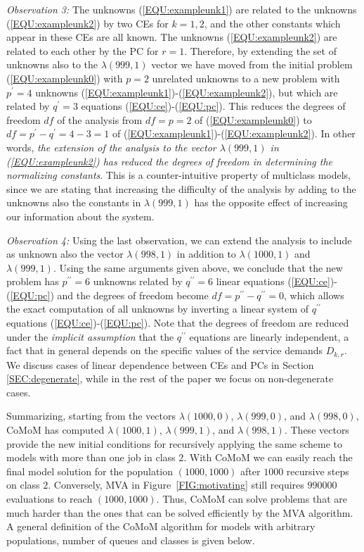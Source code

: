 \documentclass[journal,twocolumn,9.5pt]{IEEEtran}
\begin{document}
\emph{Observation 3:}  The unknowns (\ref{EQU:exampleunk1}) are related to the unknowns (\ref{EQU:exampleunk2}) by two CEs for $k=1,2$, and the other constants which appear in these CEs are all known. The unknowns (\ref{EQU:exampleunk2}) are related to each other by the PC for $r=1$. Therefore, by extending the set of unknowns also to the $\lambda(999,1)$ vector we have moved from the initial problem (\ref{EQU:exampleunk0}) with $p=2$ unrelated unknowns to a new problem with $p^\prime=4$ unknowns (\ref{EQU:exampleunk1})-(\ref{EQU:exampleunk2}), but which are related by $q^\prime=3$ equations (\ref{EQU:ce})-(\ref{EQU:pc}). This reduces the degrees of freedom $df$ of the analysis from $df=p=2$ of (\ref{EQU:exampleunk0}) to $df=p^\prime-q^\prime=4-3=1$ of (\ref{EQU:exampleunk1})-(\ref{EQU:exampleunk2}). In other words, {\em the extension of the analysis to the vector $\lambda(999,1)$ in (\ref{EQU:exampleunk2}) has reduced the degrees of freedom in determining the normalizing constants}. This is a counter-intuitive property of multiclass models, since we are stating that increasing the difficulty of the analysis by adding to the unknowns also the constants in $\lambda(999,1)$ has the opposite effect of increasing our information about the system.

\emph{Observation 4:} Using the last observation, we can extend the analysis to include as unknown also the vector $\lambda(998,1)$ in addition to  $\lambda(1000,1)$ and  $\lambda(999,1)$. Using the same arguments given
above, we conclude that the new problem has $p^{\prime\prime}=6$ unknowns related by $q^{\prime\prime}=6$ linear equations (\ref{EQU:ce})-(\ref{EQU:pc}) and the degrees of freedom become $df=p^{\prime\prime}-q^{\prime\prime}=0$, which allows the exact computation of all unknowns by inverting a linear system of $q^{\prime\prime}$ equations (\ref{EQU:ce})-(\ref{EQU:pc}). Note that the degrees of freedom are reduced under the \emph{implicit assumption} that the $q^{\prime\prime}$ equations are linearly independent, a fact that in general depends on the specific values of the service demands $D_{k,r}$. We discuss cases of linear dependence between CEs and PCs in Section \ref{SEC:degenerate}, while in the rest of the paper we focus on non-degenerate cases.

Summarizing, starting from the vectors $\lambda(1000,0)$, $\lambda(999,0)$, and $\lambda(998,0)$, CoMoM has computed $\lambda(1000,1)$, $\lambda(999,1)$, and $\lambda(998,1)$. These vectors provide the new initial conditions for recursively applying the same scheme to models with more than one job in class $2$. With CoMoM we can easily reach the final model solution for the population $(1000,1000)$ after $1000$ recursive steps on class $2$. Conversely, MVA in Figure~\ref{FIG:motivating} still requires $990000$ evaluations to reach $(1000,1000)$. Thus, CoMoM can solve problems that are much harder than the ones that can be solved efficiently by the MVA algorithm. A general definition of the CoMoM algorithm for models with arbitrary populations, number of queues and classes is given below.
\end{document}

